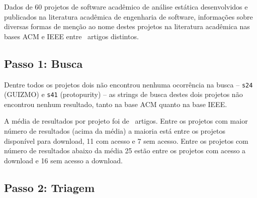 Dados de 60 projetos de software acadêmico de análise estática desenvolvidos e
publicados na literatura acadêmica de engenharia de software, informações sobre
diversas formas de menção ao nome destes projetos na literatura acadêmica nas
bases ACM e IEEE entre \SearchUniqueCount \ artigos distintos.

\subsection{Passo 1: Busca}

Dentre todos os projetos dois não encontrou nenhuma ocorrência na busca --
\texttt{s24} (GUIZMO) e \texttt{s41} (protopurity) -- as strings de busca
destes dois projetos não encontrou nenhum resultado, tanto na base ACM quanto
na base IEEE.

A média de resultados por projeto foi de \SearchUniqueMean \ artigos. Entre os
projetos com maior número de resultados (acima da média) a maioria está entre
os projetos disponível para download, 11 com acesso e 7 sem acesso.
Entre os projetos com número de resultados abaixo da média 25 estão entre os
projetos com acesso a download e 16 sem acesso a download.



\subsection{Passo 2: Triagem}

